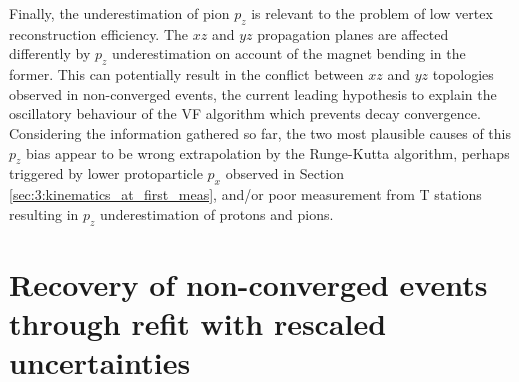 Finally, the underestimation of pion $p_z$ is relevant to the problem of low vertex reconstruction efficiency.
The $xz$ and $yz$ propagation planes are affected differently by $p_z$ underestimation on account of the magnet bending in the former.
This can potentially result in the conflict between $xz$ and $yz$ topologies observed in non-converged events, the current leading hypothesis to explain the oscillatory behaviour of the VF algorithm which prevents decay convergence.
Considering the information gathered so far, the two most plausible causes of this $p_z$ bias appear to be wrong extrapolation by the Runge-Kutta algorithm, perhaps triggered by lower protoparticle $p_x$ observed in Section \ref{sec:3:kinematics_at_first_meas}, and/or poor measurement from T stations resulting in $p_z$ underestimation of protons and pions.


\section[Recovery of non-converged events]{Recovery of non-converged events through refit with rescaled uncertainties}
\label{sec:recovery_general}
\label{sec:blowup_matrix}



